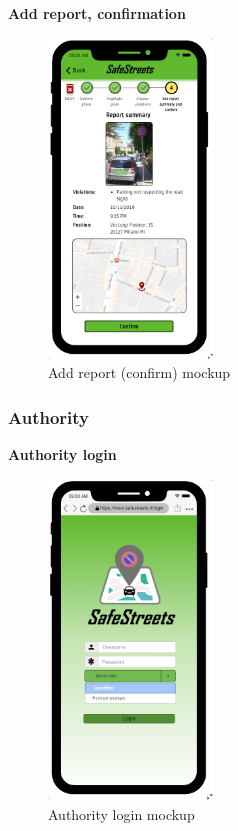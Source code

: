 					\begin{center}
						{\small \textbf{Add report, confirmation}}
					\end{center}
					\vspace{-5mm}
					\begin{figure}[h]
						\centering
						\includegraphics[height=8.5cm]{images/MockUp/User/Report4Confirm.pdf}
						\caption{Add report (confirm) mockup}
						\end{figure}
				\subsubsection{Authority}
					\vspace{-2mm}
					\begin{center}
						{\small \textbf{Authority login}}
					\end{center}
					\vspace{-5mm}
					\begin{figure}[!h]
						\centering
						\includegraphics[height=8.5cm]{images/MockUp/Authority/AuthorityLogin.png}
						\caption{Authority login mockup}
						\end{figure}
				\clearpage
				
